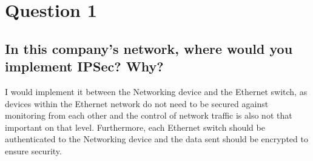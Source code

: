 \documentclass{report}
\begin{document}
	\section{Question 1}
	\startsection
		\renewcommand{\thesubsection}{\thesection.\Alph{subsection}}
		\subsection{In this company’s network, where would you implement IPSec? Why?}
		\startsubsection
			I would implement it between the Networking device and the Ethernet switch, as devices within the Ethernet network do not need to be secured against monitoring from each other and the control of network traffic is also not that important on that level. Furthermore, each Ethernet switch should be authenticated to the Networking device and the data sent should be encrypted to ensure security.
		\closesection
	\closesection
\end{document}
